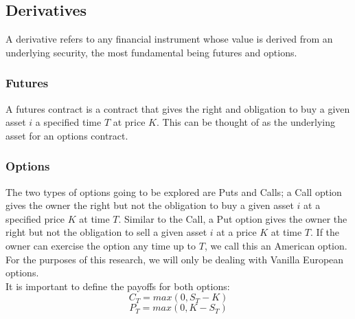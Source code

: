 \documentclass[12pt]{article}
\numberwithin{equation}{section}
\begin{document}
\subsection{Derivatives}
A derivative refers to any financial instrument whose value is derived from an 
underlying security, the most fundamental being futures and options.
\subsubsection{Futures}
A futures contract is a contract that gives the right and obligation to buy a 
given asset $i$ a specified time $T$ at price $K$. This can be thought of as the 
underlying asset for an options contract. 
\subsubsection{Options}
The two types of options going to be explored are Puts and Calls; a Call option 
gives the owner the right but not the obligation to buy a given asset $i$ at 
a specified price $K$ at time $T$. Similar to the Call, a Put option gives the 
owner the right but not the obligation to sell a given asset $i$ at a price $K$ 
at time $T$. If the owner can exercise the option any time up to $T$, we call 
this an American option. For the purposes of this research, we will only be 
dealing with Vanilla European options.\\ 
It is important to define the payoffs for both options: 
\begin{equation}
C_T = max(0,S_T-K)
\end{equation}
\begin{equation}
P_T = max(0,K-S_T)
\end{equation}
\end{document}

